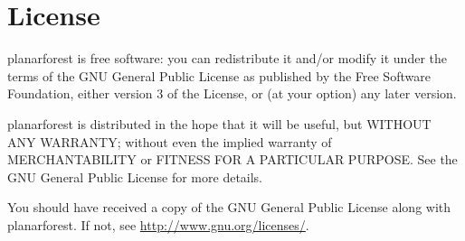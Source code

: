 \documentclass[a4paper, 11pt, pdftex]{scrartcl}
\begin{document}
\section*{License}
planarforest is free software: you can redistribute it and/or modify it under the terms of the GNU General Public License as published by the Free Software Foundation, either version 3 of the License, or (at your option) any later version.

planarforest is distributed in the hope that it will be useful, but WITHOUT ANY WARRANTY; without even the implied warranty of MERCHANTABILITY or FITNESS FOR A PARTICULAR PURPOSE.
See the GNU General Public License for more details.

You should have received a copy of the GNU General Public License along with planarforest.
If not, see \url{http://www.gnu.org/licenses/}.
\end{document}
